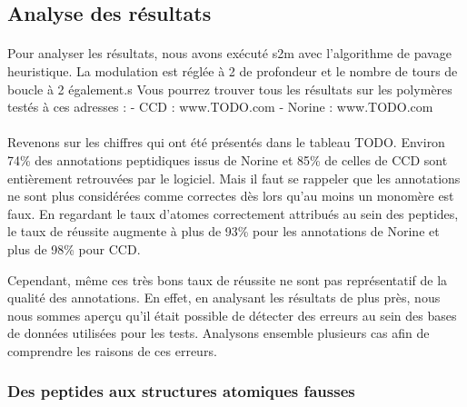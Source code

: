 \documentclass[12pt,french,twoside]{report}
\begin{document}
\subsection{Analyse des résultats}

\paragraph{}Pour analyser les résultats, nous avons exécuté s2m avec l'algorithme de pavage heuristique.
La modulation est réglée à 2 de profondeur et le nombre de tours de boucle à 2 également.s
Vous pourrez trouver tous les résultats sur les polymères testés à ces adresses :
- CCD : www.TODO.com
- Norine : www.TODO.com


\paragraph{}Revenons sur les chiffres qui ont été présentés dans le tableau TODO.
Environ 74\% des annotations peptidiques issus de Norine et 85\% de celles de CCD sont entièrement retrouvées par le logiciel.
Mais il faut se rappeler que les annotations ne sont plus considérées comme correctes dès lors qu'au moins un monomère est faux.
En regardant le taux d'atomes correctement attribués au sein des peptides, le taux de réussite augmente à plus de 93\% pour les annotations de Norine et plus de 98\% pour CCD.

Cependant, même ces très bons taux de réussite ne sont pas représentatif de la qualité des annotations.
En effet, en analysant les résultats de plus près, nous nous sommes aperçu qu'il était possible de détecter des erreurs au sein des bases de données utilisées pour les tests.
Analysons ensemble plusieurs cas afin de comprendre les raisons de ces erreurs.


\subsubsection{Des peptides aux structures atomiques fausses}
\end{document}
